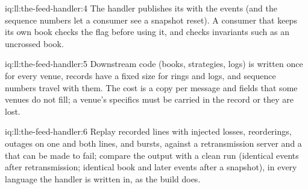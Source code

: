\begin{solution}{iq:ll:the-feed-handler:4}
The handler publishes its  with the events (and the sequence numbers let a consumer see a snapshot reset). A
consumer that keeps its own book checks the flag before using it, and checks invariants such as an uncrossed book.
\end{solution}

\begin{solution}{iq:ll:the-feed-handler:5}
Downstream code (books, strategies, logs) is written once for every venue, records have a fixed size for rings and logs, and
sequence numbers travel with them. The cost is a copy per message and fields that some venues do not fill; a venue's
specifics must be carried in the record or they are lost.
\end{solution}

\begin{solution}{iq:ll:the-feed-handler:6}
Replay recorded lines with injected losses, reorderings, outages on one and both lines, and bursts, against a retransmission
server and a  that can be made to fail; compare the output with a clean run (identical events after
retransmission; identical book and later events after a snapshot), in every language the handler is written in, as the build
does.
\end{solution}
